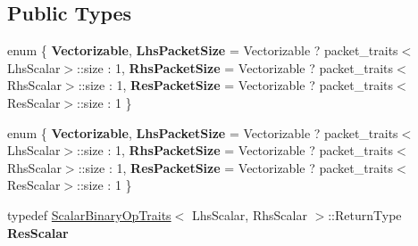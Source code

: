 \subsection*{Public Types}
\begin{DoxyCompactItemize}
\item 
\mbox{\label{struct_eigen_1_1internal_1_1general__matrix__vector__product_3_01_index_00_01_lhs_scalar_00_01_l2767aff966c7bf3a7d425c9d340a95e8_a7bbe8036f265b38440fddc90afbc1180}} 
enum \{ {\bfseries Vectorizable}, 
{\bfseries Lhs\+Packet\+Size} = Vectorizable ? packet\+\_\+traits$<$Lhs\+Scalar$>$\+:\+:size \+: 1, 
{\bfseries Rhs\+Packet\+Size} = Vectorizable ? packet\+\_\+traits$<$Rhs\+Scalar$>$\+:\+:size \+: 1, 
{\bfseries Res\+Packet\+Size} = Vectorizable ? packet\+\_\+traits$<$Res\+Scalar$>$\+:\+:size \+: 1
 \}
\item 
\mbox{\label{struct_eigen_1_1internal_1_1general__matrix__vector__product_3_01_index_00_01_lhs_scalar_00_01_l2767aff966c7bf3a7d425c9d340a95e8_a1b948b90e87b8a34c0b2b762698b44f6}} 
enum \{ {\bfseries Vectorizable}, 
{\bfseries Lhs\+Packet\+Size} = Vectorizable ? packet\+\_\+traits$<$Lhs\+Scalar$>$\+:\+:size \+: 1, 
{\bfseries Rhs\+Packet\+Size} = Vectorizable ? packet\+\_\+traits$<$Rhs\+Scalar$>$\+:\+:size \+: 1, 
{\bfseries Res\+Packet\+Size} = Vectorizable ? packet\+\_\+traits$<$Res\+Scalar$>$\+:\+:size \+: 1
 \}
\item 
\mbox{\label{struct_eigen_1_1internal_1_1general__matrix__vector__product_3_01_index_00_01_lhs_scalar_00_01_l2767aff966c7bf3a7d425c9d340a95e8_a178e003185e9a41da1b5974a8a6e7464}} 
typedef \hyperlink{group___core___module_struct_eigen_1_1_scalar_binary_op_traits}{Scalar\+Binary\+Op\+Traits}$<$ Lhs\+Scalar, Rhs\+Scalar $>$\+::Return\+Type {\bfseries Res\+Scalar}
\item 
\mbox{\label{struct_eigen_1_1internal_1_1general__matrix__vector__product_3_01_index_00_01_lhs_scalar_00_01_l2767aff966c7bf3a7d425c9d340a95e8_af21d304a208837bfba3549cbc01773cb}} 

\end{DoxyCompactItemize}
